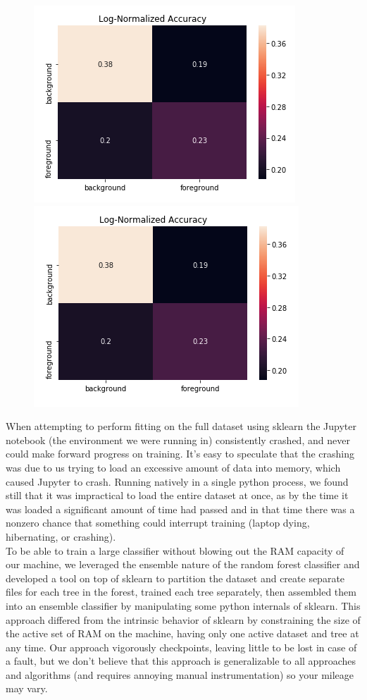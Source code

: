 \documentclass{neu_handout}
\begin{document}
\begin{figure}[h]
\centering
{
\includegraphics[width=0.3\linewidth]{rflocalgini}
\label{fig:rflocalgini}
}
{
\includegraphics[width=0.3\linewidth]{rflocalentropy}
\label{fig:rflocalentropy}
}
\end{figure}

When attempting to perform fitting on the full dataset using sklearn the Jupyter notebook (the environment we were running in) consistently crashed, and never could make forward progress on training. It's easy to speculate that the crashing was due to us trying to load an excessive amount of data into memory, which caused Jupyter to crash. Running natively in a single python process, we found still that it was impractical to load the entire dataset at once, as by the time it was loaded a significant amount of time had passed and in that time there was a nonzero chance that something could interrupt training (laptop dying, hibernating, or crashing).\\

To be able to train a large classifier without blowing out the RAM capacity of our machine, we leveraged the ensemble nature of the random forest classifier and developed a tool on top of sklearn to partition the dataset and create separate files for each tree in the forest, trained each tree separately, then assembled them into an ensemble classifier by manipulating some python internals of sklearn. This approach differed from the intrinsic behavior of sklearn by constraining the size of the active set of RAM on the machine, having only one active dataset and tree at any time. Our approach vigorously checkpoints, leaving little to be lost in case of a fault, but we don't believe that this approach is generalizable to all approaches and algorithms (and requires annoying manual instrumentation) so your mileage may vary.
\end{document}
